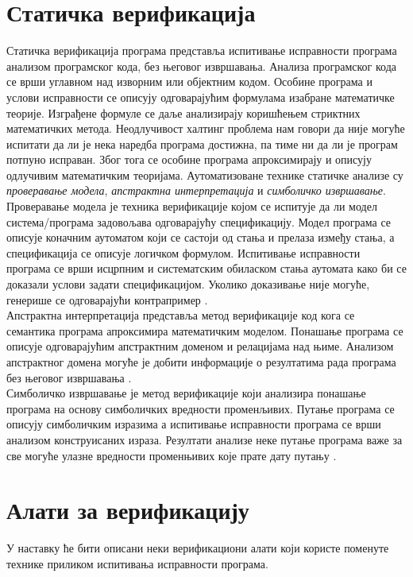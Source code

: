 \documentclass[12pt,oneside]{memoir}
\begin{document}
  \section{Статичка верификација}
  \label{statver}
  Статичка верификација програма представља испитивање исправности програма анализом програмског кода, без његовог извршавања. Анализа програмског кода се врши углавном над изворним или објектним кодом. Особине програма и услови исправности се описују одговарајућим формулама изабране математичке теорије. Изграђене формуле се даље анализирају коришћењем стриктних математичких метода. Неодлучивост халтинг проблема нам говори да није могуће испитати да ли је нека наредба програма достижна, па тиме ни да ли је програм потпуно исправан. Због тога се особине програма апроксимирају и описују одлучивим математичким теоријама. Аутоматизоване технике статичке анализе су \emph{проверавање модела}, \emph{апстрактна интерпретација} и \emph{симболичко извршавање}.  
  \\ 
Проверавање модела је техника верификације којом се испитује да ли модел система/програма задовољава одговарајућу спецификацију. Модел програма се описује коначним аутоматом који се састоји од стања и прелаза између стања, а спецификација се описује логичком формулом. Испитивање исправности програма се врши исцрпним и систематским обиласком стања аутомата како би се доказали услови задати спецификацијом. Уколико доказивање није могуће, генерише се одговарајући контрапример \cite{verif_tech}.
\\ 
Апстрактна интерпретација представља метод верификације код кога се семантика програма апроксимира математичким моделом. Понашање програма се описује одговарајућим апстрактним доменом и релацијама над њиме. Анализом апстрактног домена могуће је добити информације о резултатима рада програма без његовог извршавања \cite{verif_tech}. 
\\ 
Симболичко извршавање је метод верификације који анализира понашање програма на основу симболичких вредности променљивих. Путање програма се описују симболичким изразима а испитивање исправности програма се врши анализом конструисаних израза. Резултати анализе неке путање програма важе за све могуће улазне вредности променњивих које прате дату путању \cite{symbolic_exec}.

  \section{Алати за верификацију}
У наставку ће бити описани неки верификациони алати који користе поменуте технике приликом испитивања исправности програма. 
\end{document}
